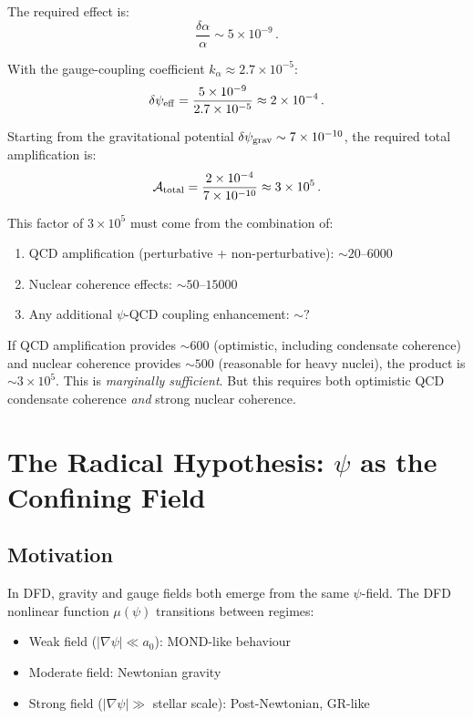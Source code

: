 \documentclass[aps,prd,twocolumn,superscriptaddress,floatfix,nofootinbib]{revtex4-2}
\newcommand{\mufunction}{\mu}
\begin{document}
The required effect is:
\begin{equation}
\frac{\delta\alpha}{\alpha} \sim 5 \times 10^{-9} \, .
\end{equation}

With the gauge-coupling coefficient $k_\alpha \approx 2.7 \times 10^{-5}$:
\begin{equation}
\delta\psi_{\rm eff} = \frac{5 \times 10^{-9}}{2.7 \times 10^{-5}} \approx 2
\times 10^{-4} \, .
\label{eq:required_psi}
\end{equation}

Starting from the gravitational potential $\delta\psi_{\rm grav} \sim 7 \times
10^{-10}$, the required total amplification is:
\begin{equation}
\mathcal{A}_{\rm total} = \frac{2 \times 10^{-4}}{7 \times 10^{-10}} \approx 3
\times 10^{5} \, .
\label{eq:required_amp}
\end{equation}

This factor of $3 \times 10^5$ must come from the combination of:
\begin{enumerate}
\item QCD amplification (perturbative + non-perturbative): $\sim 20$--$6000$
\item Nuclear coherence effects: $\sim 50$--$15000$
\item Any additional $\psi$-QCD coupling enhancement: $\sim ?$
\end{enumerate}

If QCD amplification provides $\sim 600$ (optimistic, including condensate
coherence) and nuclear coherence provides $\sim 500$ (reasonable for heavy
nuclei), the product is $\sim 3 \times 10^5$. This is \emph{marginally
sufficient}. But this requires both optimistic QCD condensate coherence \emph{and}
strong nuclear coherence.


\section{The Radical Hypothesis: $\psi$ as the Confining Field}
\label{sec:radical}

\subsection{Motivation}

In DFD, gravity and gauge fields both emerge from the same $\psi$-field. The DFD
nonlinear function $\mufunction(\psi)$ transitions between regimes:
\begin{itemize}
\item Weak field ($|\nabla\psi| \ll a_0$): MOND-like behaviour
\item Moderate field: Newtonian gravity
\item Strong field ($|\nabla\psi| \gg $ stellar scale): Post-Newtonian, GR-like
\end{itemize}
\end{document}
